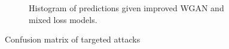 \begin{figure}[t]
\begin{subfigure}[b]{0.4\textwidth}
        \caption{Histogram of predictions given improved WGAN and mixed loss models.}
        \label{fig:pred_comp_spk0}
    \end{subfigure}
    \caption{Confusion matrix of targeted attacks}
    \label{fig:confusion_matrices}
\end{figure}
